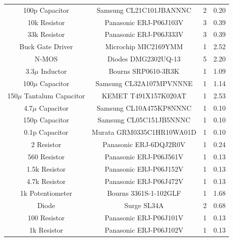 \documentclass[12pt]{article}
\begin{document}
\begin{table}[!h]
{\begin{tabular}{ |c|c|c|c| }
 		100p Capacitor & Samsung CL21C101JBANNNC & 2 & 0.20 \\
 		10k Resistor & Panasonic ERJ-P06J103V & 3 & 0.39 \\
 		33k Resistor & Panasonic ERJ-P06J333V & 3 & 0.39 \\
 		Buck Gate Driver & Microchip MIC2169YMM & 1 & 2.52 \\
 		N-MOS & Diodes DMG2302UQ-13 & 5 & 2.20 \\
 		3.3$\mu$ Inductor & Bourns SRP0610-3R3K & 1 & 1.09 \\
 		100$\mu$ Capacitor & Samsung CL32A107MPVNNNE & 1 & 1.14 \\
 		150$\mu$ Tantalum Capacitor & KEMET T491X157K020AT & 1 & 2.53 \\
 		4.7$\mu$ Capacitor & Samsung CL10A475KP8NNNC & 1 & 0.10 \\
 		150p Capacitor & Samsung CL05C151JB5NNNC & 1 & 0.10 \\
 		0.1p Capacitor & Murata GRM0335C1HR10WA01D & 1 & 0.10 \\
 		2 Resistor & Panasonic ERJ-6DQJ2R0V & 1 & 0.24 \\
 		560 Resistor & Panasonic ERJ-P06J561V & 1 & 0.13 \\
 		1.5k Resistor & Panasonic ERJ-P06J152V & 1 & 0.13 \\
 		4.7k Resistor & Panasonic ERJ-P06J472V & 1 & 0.13 \\
 		1k Potentiometer & Bourns 3361S-1-102GLF & 1 & 1.68 \\
 		Diode & Surge SL34A & 2 & 0.68 \\
 		100 Resistor & Panasonic ERJ-P06J101V & 1 & 0.13 \\
 		1k Resistor & Panasonic ERJ-P06J102V & 1 & 0.13 \\
 		\hline
	\end{tabular}
	}
\end{table}
\end{document}

